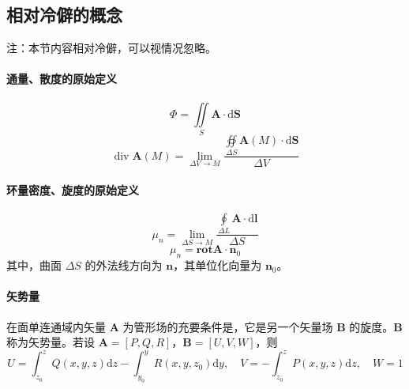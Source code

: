 \documentclass[UTF8]{ctexart}
\renewcommand\d{\mathrm{d}}
\newcommand\A{\boldsymbol{A}}
\renewcommand\div{\operatorname{div}} %
\newcommand\rot{\mathbf{rot}}
\begin{document}
\newpage
{}
\BgThispage
\subsection{相对冷僻的概念}
注：本节内容相对冷僻，可以视情况忽略。
\paragraph{通量、散度的原始定义} 
\begin{equation*}
    \varPhi = \iint\limits_{S} \A\cdot \d\boldsymbol{S}
\end{equation*}
\begin{equation*}
    \div \A(M) = \lim\limits_{\Delta V\to M} \dfrac{\displaystyle \oiint\limits_{\Delta S} \A(M)\cdot \d\boldsymbol{S}}{\Delta V}
\end{equation*}

\paragraph{环量密度、旋度的原始定义}
\begin{equation*}
    \mu_n = \lim\limits_{\Delta S\to M} \dfrac{\displaystyle\oint\limits_{\Delta L} \A\cdot\d\boldsymbol{l}}{\Delta S}
\end{equation*} 
\begin{equation*}
    \mu_n = \rot\A\cdot\boldsymbol{n}_0
\end{equation*}
其中，曲面 $\Delta S$ 的外法线方向为 $\boldsymbol{n}$，其单位化向量为 $\boldsymbol{n}_0$。

\paragraph{矢势量} 在面单连通域内矢量 $\A$ 为管形场的充要条件是，它是另一个矢量场 $\boldsymbol{B}$ 的旋度。$\boldsymbol{B}$ 称为矢势量。若设 $\A=[P,Q,R]$，$\boldsymbol{B}=[U,V,W]$，则
\begin{equation*}
    U=\int_{z_0}^z Q(x,y,z)\d z-\int_{y_0}^y R(x,y,z_0)\d y,\quad V=-\int_{z_0}^z P(x,y,z)\d z,\quad W=1
\end{equation*}
\end{document}
